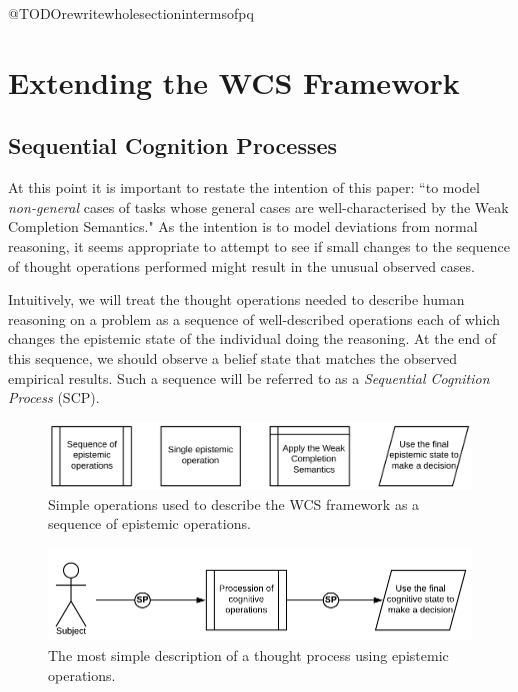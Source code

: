 \documentclass{article}
\begin{document}
@TODOrewritewholesectionintermsofpq

\section{Extending the WCS Framework} \label{sec:scp}

\subsection{Sequential Cognition Processes}
At this point it is important to restate the intention of this paper: ``to model \textit{non-general} cases of tasks whose general cases are well-characterised by the Weak Completion Semantics." As the intention is to model deviations from normal reasoning, it seems appropriate to attempt to see if small changes to the sequence of thought operations performed might result in the unusual observed cases.

Intuitively, we will treat the thought operations needed to describe human reasoning on a problem as a sequence of well-described operations each of which changes the epistemic state of the individual doing the reasoning. At the end of this sequence, we should observe a belief state that matches the observed empirical results. Such a sequence will be referred to as a \textit{Sequential Cognition Process} (SCP).

\begin{figure}
\centering \includegraphics[scale=.6]{allBoxes}
\caption{Simple operations used to describe the WCS framework as a sequence of epistemic operations.}
\label{fig:boxes}
\end{figure}

\begin{figure}
\centering \includegraphics[scale=.36]{general}
\caption{The most simple description of a thought process using epistemic operations.}
\label{fig:general}
\end{figure}
\end{document}

